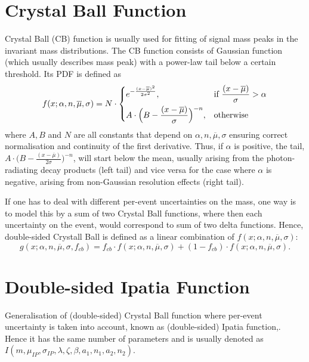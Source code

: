 \label{sec:PDFS}
\section{Crystal Ball Function}
\label{CB}
Crystal Ball (\Gls{CB}) function \cite{Skwarnicki:1986xj}
is usually used for fitting of signal mass peaks in the invariant mass distributions. The \gls{CB} function consists of Gaussian function (which usually describes mass peak) with a power-law tail below a certain threshold. Its PDF is defined as
\begin{equation}
  f(x; \alpha,n,\overline{\mu},\sigma) = N \cdot
  \begin{dcases}
    e^{-\frac{(x-\overline{\mu})^{2}}{2\sigma^{2}}},& \text{if } \frac{(x-\overline{\mu})}{\sigma}  >\alpha\\
    A \cdot\Big(B - \frac{(x-\overline{\mu})}{\sigma}\Big)^{-n}, & \text{otherwise}
  \end{dcases}
  \label{Eq:CB}
\end{equation}
where $A, B$ and $N$ are all constants that depend on ${\alpha,n,\overline{\mu},\sigma}$ ensuring correct normalisation and continuity of the first derivative. Thus, if $\alpha$ is positive, the tail, $A\cdot \Big(B - \frac{(x-\overline{\mu})}{2\sigma}\Big)^{-n}$, will start below the mean, usually arising from the photon-radiating decay products (left tail) and vice versa for the case where $\alpha$ is negative, arising from non-Gaussian resolution effects (right tail).

If one has to deal with different per-event uncertainties on the mass, one way is to model this by a sum of two Crystal Ball functions, where then each uncertainty on the event, would correspond to sum of two delta functions. Hence, double-sided Crystall Ball is defined as a linear combination of $f(x; \alpha,n,\overline{\mu},\sigma)$:
\begin{equation}
	g(x; \alpha,n,\overline{\mu},\sigma, f_{cb}) = f_{cb} \cdot f(x; \alpha,n,\overline{\mu},\sigma) + (1-f_{cb})\cdot f(x; \alpha,n,\overline{\mu},\sigma).
\end{equation}


\section{Double-sided Ipatia Function}
\label{IP}
Generalisation of (double-sided) Crystal Ball function where per-event uncertainty is taken into account, known as (double-sided) Ipatia function,\cite{Santos:2013gra}. 
Hence it has the same number of parameters and is usually denoted as $I(m,\mu_{IP},\sigma_{IP},\lambda,\zeta,\beta,a_{1},n_{1},a_{2},n_{2})$.

